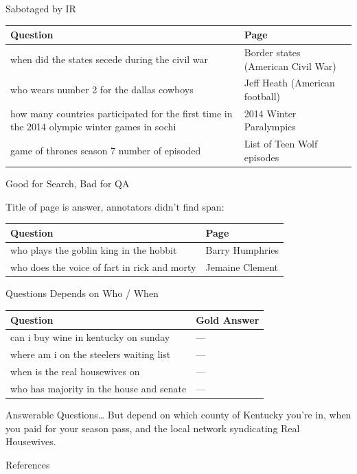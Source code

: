 \documentclass[xcolor=dvipsnames,xcolor=table]{beamer}
\begin{document}
{\begin{columns}
\end{columns}

}

\begin{frame}{Sabotaged by IR}

  \begin{small}
  \begin{tabular}{p{7cm}p{3cm}}
    \toprule
    Question & Page \\
    \hline
 when did the states secede during the civil war &  Border states (American Civil War) \\
 who wears number 2 for the dallas cowboys &  Jeff Heath (American football) \\
 how many countries participated for the first time in the 2014 olympic winter games in sochi & 2014 Winter Paralympics \\
 game of thrones season 7 number of episoded &  List of Teen Wolf episodes \\
 \bottomrule
  \end{tabular}
  \end{small}

\end{frame}

\begin{frame}{Good for Search, Bad for QA}

  Title of page is answer, annotators didn't find span:
  \begin{tabular}{p{7cm}p{3cm}}
    \toprule
    Question & Page \\
    \hline
  who plays the goblin king in the hobbit &  Barry Humphries  \\
  who does the voice of fart in rick and morty & Jemaine Clement   \\
 \bottomrule
  \end{tabular}
\end{frame}

\begin{frame}{Questions Depends on Who / When}
  \begin{tabular}{p{8cm}p{2cm}}
    \toprule
    Question & Gold Answer \\
    \hline
    can i buy wine in kentucky on sunday & --- \\
    where am i on the steelers waiting list & --- \\
    when is the real housewives on & --- \\
    who has majority in the house and senate & --- \\
    \bottomrule
  \end{tabular}  

  \pause

  \begin{block}{Answerable Questions\dots}
  But depend on which county of Kentucky you're in,
  when you paid for your season pass, and the local network
  syndicating Real Housewives.
  \end{block}
  
\end{frame}


\begin{frame}{References}

\tiny

\end{frame}
\end{document}
